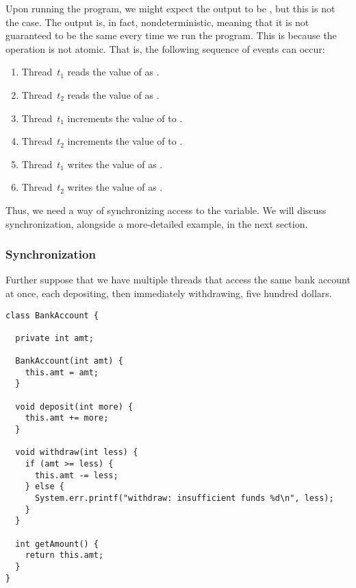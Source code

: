 Upon running the program, we might expect the output to be , but this is not the case. 
The output is, in fact, nondeterministic, meaning that it is not guaranteed to be the same every time we run the program. 
This is because the  operation is not atomic. 
That is, the following sequence of events can occur:

\begin{enumerate}
  \item Thread~$t_1$ reads the value of  as .
  \item Thread~$t_2$ reads the value of  as .
  \item Thread~$t_1$ increments the value of  to .
  \item Thread~$t_2$ increments the value of  to .
  \item Thread~$t_1$ writes the value of  as .
  \item Thread~$t_2$ writes the value of  as .
\end{enumerate}

Thus, we need a way of synchronizing access to the  variable. 
We will discuss synchronization, alongside a more-detailed example, in the next section.

\subsubsection*{Synchronization}

Further suppose that we have multiple threads that access the same bank account at once, each depositing, then immediately withdrawing, five hundred dollars.

\begin{lstlisting}[language=MyJava]
class BankAccount {

  private int amt;

  BankAccount(int amt) { 
    this.amt = amt; 
  }

  void deposit(int more) { 
    this.amt += more; 
  }

  void withdraw(int less) {
    if (amt >= less) { 
      this.amt -= less; 
    } else { 
      System.err.printf("withdraw: insufficient funds %d\n", less); 
    }
  }

  int getAmount() { 
    return this.amt; 
  }
}
\end{lstlisting}


